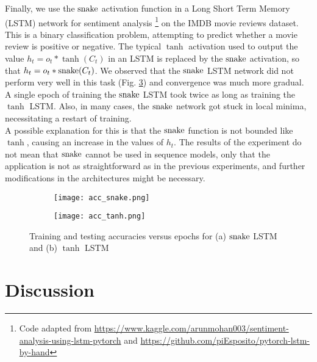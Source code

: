 Finally, we use the $ \operatorname{snake} $ activation function in a Long Short Term Memory (LSTM) network for sentiment analysis 
\footnote{Code adapted from \url{https://www.kaggle.com/arunmohan003/sentiment-analysis-using-lstm-pytorch} and \url{https://github.com/piEsposito/pytorch-lstm-by-hand}} 
on the IMDB movie reviews dataset. 
This is a binary classification problem, attempting to predict whether a movie review is positive or negative. The typical $ \tanh $ activation used to output the value $ h_{t} = o_{t} * \tanh(C_t) $ in an LSTM is replaced by the $ \operatorname{snake} $ activation, so that $h_{t} = o_{t} * \operatorname{snake}(C_{t})$. 
We observed that the $ \operatorname{snake} $ LSTM network did not perform very well in this task (Fig. \ref{fig:lstm_acc}) and convergence was much more gradual. A single epoch of training the $ \operatorname{snake} $ LSTM took twice as long as training the $ \tanh $ LSTM.  Also, in many cases, the $ \operatorname{snake} $ network got stuck in local minima, necessitating a restart of training. \\

A possible explanation for this is that the $ \operatorname{snake} $ function is not bounded like $ \tanh $, causing an increase in the values of $ h_{t} $. The results of the experiment do not mean that $ \operatorname{snake} $ cannot be used in sequence models, only that the application is not as straightforward as in the previous experiments, and further modifications in the architectures might be necessary. 

\begin{figure}[h]
  \centering
  \begin{subfigure}{0.45\textwidth}
    \centering
    \texttt{[image: acc\_snake.png]} 
    \caption{}
    \label{fig:subim8}
  \end{subfigure}
  \begin{subfigure}{0.45\textwidth}
    \centering
    \texttt{[image: acc\_tanh.png]}
    \caption{}
    \label{fig:subim9}
  \end{subfigure}
  \caption{Training and testing accuracies versus epochs for (a) $ \operatorname{snake} $ LSTM and (b) $ \tanh $ LSTM}
  \label{fig:lstm_acc}
\end{figure}


\section{Discussion}


